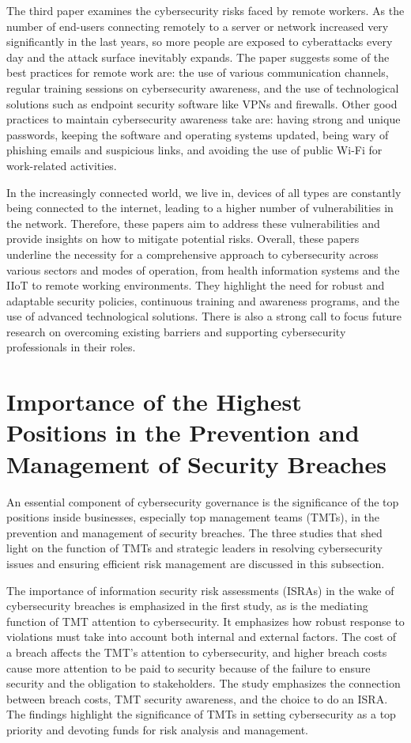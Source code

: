 \documentclass[journal]{IEEEtran}
\begin{document}
The third paper examines the cybersecurity risks faced by remote workers. As the number of end-users connecting remotely to a server or network increased very significantly in the last years, so more people are exposed to cyberattacks every day and the attack surface inevitably expands. The paper suggests some of the best practices for remote work are: the use of various communication channels, regular training sessions on cybersecurity awareness, and the use of technological solutions such as endpoint security software like VPNs and firewalls. Other good practices to maintain cybersecurity awareness take are: having strong and unique passwords, keeping the software and operating systems updated, being wary of phishing emails and suspicious links, and avoiding the use of public Wi-Fi for work-related activities.

In the increasingly connected world, we live in, devices of all types are constantly being connected to the internet, leading to a higher number of vulnerabilities in the network. Therefore, these papers aim to address these vulnerabilities and provide insights on how to mitigate potential risks.
Overall, these papers underline the necessity for a comprehensive approach to cybersecurity across various sectors and modes of operation, from health information systems and the IIoT to remote working environments. They highlight the need for robust and adaptable security policies, continuous training and awareness programs, and the use of advanced technological solutions. There is also a strong call to focus future research on overcoming existing barriers and supporting cybersecurity professionals in their roles.



\section{Importance of the Highest Positions in the Prevention and Management of Security Breaches}

An essential component of cybersecurity governance is the significance of the top positions inside businesses, especially top management teams (TMTs), in the prevention and management of security breaches. The three studies that shed light on the function of TMTs and strategic leaders in resolving cybersecurity issues and ensuring efficient risk management are discussed in this subsection.

The importance of information security risk assessments (ISRAs) in the wake of cybersecurity breaches is emphasized in the first study, as is the mediating function of TMT attention to cybersecurity. It emphasizes how robust response to violations must take into account both internal and external factors. The cost of a breach affects the TMT's attention to cybersecurity, and higher breach costs cause more attention to be paid to security because of the failure to ensure security and the obligation to stakeholders. The study emphasizes the connection between breach costs, TMT security awareness, and the choice to do an ISRA. The findings highlight the significance of TMTs in setting cybersecurity as a top priority and devoting funds for risk analysis and management.
\end{document}
